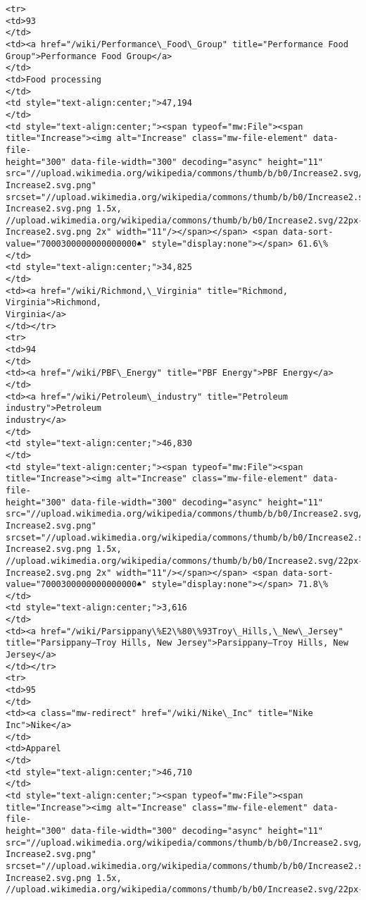\documentclass[11pt]{article}
\begin{document}
\begin{Verbatim}[commandchars=\\\{\}]
<tr>
<td>93
</td>
<td><a href="/wiki/Performance\_Food\_Group" title="Performance Food
Group">Performance Food Group</a>
</td>
<td>Food processing
</td>
<td style="text-align:center;">47,194
</td>
<td style="text-align:center;"><span typeof="mw:File"><span
title="Increase"><img alt="Increase" class="mw-file-element" data-file-
height="300" data-file-width="300" decoding="async" height="11"
src="//upload.wikimedia.org/wikipedia/commons/thumb/b/b0/Increase2.svg/11px-
Increase2.svg.png"
srcset="//upload.wikimedia.org/wikipedia/commons/thumb/b/b0/Increase2.svg/17px-
Increase2.svg.png 1.5x,
//upload.wikimedia.org/wikipedia/commons/thumb/b/b0/Increase2.svg/22px-
Increase2.svg.png 2x" width="11"/></span></span> <span data-sort-
value="7000300000000000000♠" style="display:none"></span> 61.6\%
</td>
<td style="text-align:center;">34,825
</td>
<td><a href="/wiki/Richmond,\_Virginia" title="Richmond, Virginia">Richmond,
Virginia</a>
</td></tr>
<tr>
<td>94
</td>
<td><a href="/wiki/PBF\_Energy" title="PBF Energy">PBF Energy</a>
</td>
<td><a href="/wiki/Petroleum\_industry" title="Petroleum industry">Petroleum
industry</a>
</td>
<td style="text-align:center;">46,830
</td>
<td style="text-align:center;"><span typeof="mw:File"><span
title="Increase"><img alt="Increase" class="mw-file-element" data-file-
height="300" data-file-width="300" decoding="async" height="11"
src="//upload.wikimedia.org/wikipedia/commons/thumb/b/b0/Increase2.svg/11px-
Increase2.svg.png"
srcset="//upload.wikimedia.org/wikipedia/commons/thumb/b/b0/Increase2.svg/17px-
Increase2.svg.png 1.5x,
//upload.wikimedia.org/wikipedia/commons/thumb/b/b0/Increase2.svg/22px-
Increase2.svg.png 2x" width="11"/></span></span> <span data-sort-
value="7000300000000000000♠" style="display:none"></span> 71.8\%
</td>
<td style="text-align:center;">3,616
</td>
<td><a href="/wiki/Parsippany\%E2\%80\%93Troy\_Hills,\_New\_Jersey"
title="Parsippany–Troy Hills, New Jersey">Parsippany–Troy Hills, New Jersey</a>
</td></tr>
<tr>
<td>95
</td>
<td><a class="mw-redirect" href="/wiki/Nike\_Inc" title="Nike Inc">Nike</a>
</td>
<td>Apparel
</td>
<td style="text-align:center;">46,710
</td>
<td style="text-align:center;"><span typeof="mw:File"><span
title="Increase"><img alt="Increase" class="mw-file-element" data-file-
height="300" data-file-width="300" decoding="async" height="11"
src="//upload.wikimedia.org/wikipedia/commons/thumb/b/b0/Increase2.svg/11px-
Increase2.svg.png"
srcset="//upload.wikimedia.org/wikipedia/commons/thumb/b/b0/Increase2.svg/17px-
Increase2.svg.png 1.5x,
//upload.wikimedia.org/wikipedia/commons/thumb/b/b0/Increase2.svg/22px-

\end{Verbatim}
\end{document}
